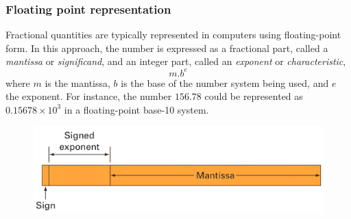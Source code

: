 \documentclass[notes]{beamer}
\begin{document}
\begin{frame}
	\frametitle{Floating point representation}
	Fractional quantities are typically represented in computers using floating-point form. In this approach, the number is expressed as a fractional part, called a \textit{mantissa} or \textit{significand}, and an integer part, called an \textit{exponent} or \textit{characteristic},
	\begin{equation*}
		m.b^e
	\end{equation*}
	where $m$ is the mantissa, $b$ is the base of the number system being used, and $e$ the
	exponent. For instance, the number $156.78$ could be represented as $0.15678\times 10^3$ in a floating-point base-10 system.
	\begin{figure}[ht]
		\centering
		\includegraphics[width=\textwidth]{figs/floating-point.png}
	\end{figure}
\end{frame}

\end{document}
